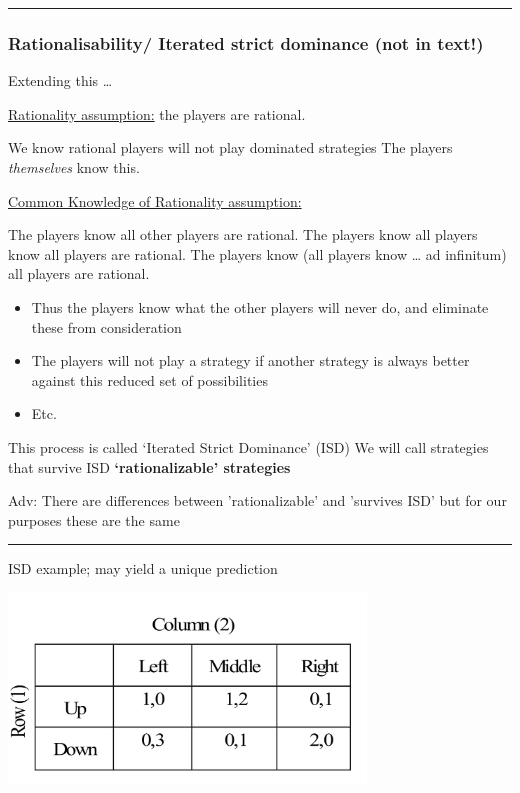 \documentclass[]{article}
\providecommand{\tightlist}{%
  \setlength{\itemsep}{0pt}\setlength{\parskip}{0pt}}
\begin{document}
\begin{center}\rule{0.5\linewidth}{\linethickness}\end{center}

\hypertarget{rationalisability-iterated-strict-dominance-not-in-text}{%
\subsubsection{Rationalisability/ Iterated strict dominance (not in text!)}\label{rationalisability-iterated-strict-dominance-not-in-text}}

Extending this \ldots{}

\underline{Rationality assumption:} the players are rational.

We know rational players will not play dominated strategies
The players \emph{themselves} know this.

\bigskip

\underline{Common Knowledge of Rationality assumption:}

The players know all other players are rational. The players know all players know all players are rational. The players know (all players know \ldots{} ad infinitum) all players are rational.

\begin{itemize}
\tightlist
\item
  Thus the players know what the other players will never do, and eliminate these from consideration
\item
  The players will not play a strategy if another strategy is always better against this reduced set of possibilities
\item
  Etc.
\end{itemize}

This process is called `Iterated Strict Dominance' (ISD) We will call strategies that survive ISD \textbf{`rationalizable' strategies}

\textcolor{RawSienna}{Adv: There are differences between 'rationalizable' and 'survives ISD' but for our purposes these are the same}

\begin{center}\rule{0.5\linewidth}{\linethickness}\end{center}

ISD example; may yield a unique prediction

\includegraphics[height=2in]{picsfigs/matrixforISD.png}
\end{document}

